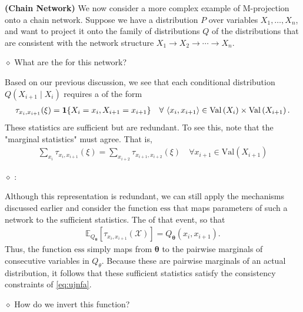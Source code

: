 \documentclass{article}
\newcommand{\bfs}[1]{\textbf{({#1}) }}
\begin{document}
\begin{exma}\bfs{Chain Network}
We now consider a more complex example of M-projection onto a chain network. Suppose we have a distribution $P$ over variables $X_{1}, \ldots, X_{n}$, and want to project it onto the family of distributions $Q$ of the distributions that are consistent with the network structure $X_{1} \rightarrow X_{2} \rightarrow \cdots \rightarrow X_{n}$.

$\diamond$ What are the  for this network? 

Based on our previous discussion, we see that each conditional distribution $Q\left(X_{i+1} \mid X_{i}\right)$ requires a  of the form
\begin{align*}
\tau_{x_{i}, x_{i+1}}(\xi)=\indicate{X_{i}=x_{i}, X_{i+1}=x_{i+1}}\quad \forall\left\langle x_{i}, x_{i+1}\right\rangle \in \mathrm{Val}\left(X_{i}\right) \times \mathrm{Val}\left(X_{i+1}\right) .
\end{align*}
These statistics are sufficient but are redundant. To see this, note that the "marginal statistics" must agree. That is,
\begin{align}
\sum_{x_{i}} \tau_{x_{i}, x_{i+1}}(\xi)=\sum_{x_{i+2}} \tau_{x_{i+1}, x_{i+2}}(\xi) \quad  \forall x_{i+1} \in \mathrm{Val}\left(X_{i+1}\right)\label{eq:ujnfa}
\end{align}

$\diamond$ :

Although this representation is redundant, we can still apply the mechanisms discussed earlier and consider the function $\mathrm{ess}$ that maps parameters of such a network to the sufficient statistics. The  of that event, so that
\begin{align*}
\mathbb{E}_{Q_{\boldsymbol{\theta}}}\left[\tau_{x_{i}, x_{i+1}}(\mathcal{X})\right]=Q_{\boldsymbol{\theta}}\left(x_{i}, x_{i+1}\right) .
\end{align*}
Thus, the function $\mathrm{ess}$ simply maps from $\boldsymbol{\theta}$ to the pairwise marginals of consecutive variables in $Q_{\theta}$. Because these are pairwise marginals of an actual distribution, it follows that these sufficient statistics satisfy the consistency constraints of \cref{eq:ujnfa}.

$\diamond$ How do we invert this function? 


\end{exma}
\end{document}
